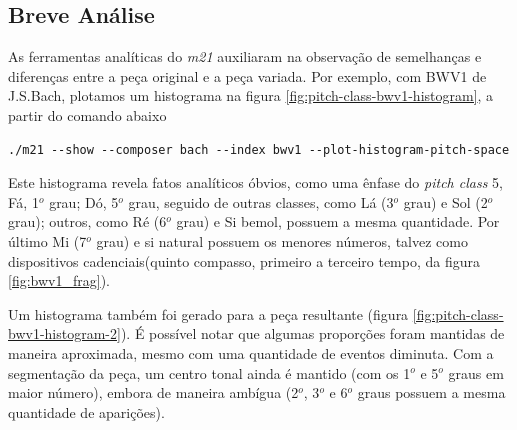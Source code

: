 \subsection*{Breve Análise}

As ferramentas analíticas do \emph{m21} auxiliaram na observação de semelhanças e diferenças entre a peça original e a peça variada. Por exemplo, com BWV1 de J.S.Bach, plotamos um histograma na figura \ref{fig:pitch-class-bwv1-histogram}, a partir do comando abaixo

\begin{listing}
\begin{verbatim}
./m21 --show --composer bach --index bwv1 --plot-histogram-pitch-space
\end{verbatim}
\label{code:plot}
\end{listing}

Este histograma revela fatos analíticos óbvios, como uma ênfase do \emph{pitch class} 5, Fá, 1$^o$ grau; Dó, 5$^o$ grau, seguido de outras classes, como Lá (3$^o$ grau) e Sol (2$^o$ grau); outros, como Ré (6$^o$ grau) e Si bemol, possuem a mesma quantidade. Por último Mi (7$^o$ grau) e si natural possuem os menores números, talvez como dispositivos cadenciais(quinto compasso, primeiro a terceiro tempo, da figura \ref{fig:bwv1_frag}).

Um histograma também foi gerado para a peça resultante (figura \ref{fig:pitch-class-bwv1-histogram-2}). É possível notar que algumas proporções foram mantidas de maneira aproximada, mesmo com uma quantidade de eventos diminuta. Com a segmentação da peça, um centro tonal ainda é mantido (com os 1$^o$ e 5$^o$ graus em maior número), embora de maneira ambígua (2$^o$, 3$^o$ e 6$^o$ graus possuem a mesma quantidade de aparições).

